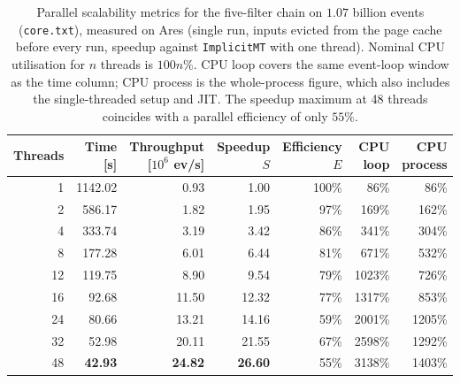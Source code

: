 \begin{table}[htbp]
\centering
\caption{Parallel scalability metrics for the five-filter chain on $1.07$ billion events (\texttt{core.txt}), measured on Ares (single run, inputs evicted from the page cache before every run, speedup against \texttt{ImplicitMT} with one thread). Nominal CPU utilisation for $n$ threads is $100n\%$. CPU loop covers the same event-loop window as the time column; CPU process is the whole-process figure, which also includes the single-threaded setup and JIT. The speedup maximum at 48 threads coincides with a parallel efficiency of only $55\%$.}
\label{tab:scalability-chain}
\begin{tabular}{rrrrrrr}
\toprule
Threads & Time [s] & Throughput [$10^6$ ev/s] & Speedup $S$ & Efficiency $E$ & CPU loop & CPU process \\
\midrule
 1 & 1142.02 & 0.93 & 1.00 & 100\% & 86\% & 86\% \\
 2 & 586.17 & 1.82 & 1.95 & 97\% & 169\% & 162\% \\
 4 & 333.74 & 3.19 & 3.42 & 86\% & 341\% & 304\% \\
 8 & 177.28 & 6.01 & 6.44 & 81\% & 671\% & 532\% \\
12 & 119.75 & 8.90 & 9.54 & 79\% & 1023\% & 726\% \\
16 & 92.68 & 11.50 & 12.32 & 77\% & 1317\% & 853\% \\
24 & 80.66 & 13.21 & 14.16 & 59\% & 2001\% & 1205\% \\
32 & 52.98 & 20.11 & 21.55 & 67\% & 2598\% & 1292\% \\
48 & \textbf{42.93} & \textbf{24.82} & \textbf{26.60} & 55\% & 3138\% & 1403\% \\
\bottomrule
\end{tabular}
\end{table}
